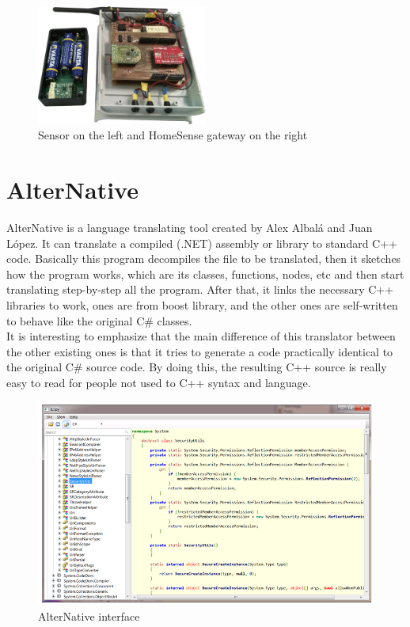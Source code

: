 \begin{figure}[H]\begin{center}
 \centering
  \captionsetup{justification=centering}
  \includegraphics[width=0.5\textwidth]{pictures/proposal/homesense}
  \caption{Sensor on the left and HomeSense gateway on the right \label{fig:Proposal-HomeSense}}
\end{center}\end{figure}

\section{AlterNative}\label{S:Proposal-AlterNative}
AlterNative is a language translating tool created by Alex Albal\'{a} and Juan L\'{o}pez. It can translate a compiled (.NET) assembly or library to standard C++ code. Basically this program decompiles the file to be translated, then it sketches how the program works, which are its classes, functions, nodes, etc and then start translating step-by-step all the program. After that, it links the necessary C++ libraries to work, ones are from boost library, and the other ones are self-written to behave like the original C\# classes.
\\
It is interesting to emphasize that the main difference of this translator between the other existing ones is that it tries to generate a code practically identical to the original C\# source code. By doing this, the resulting C++ source is really easy to read for people not used to C++ syntax and language.
\begin{figure}[H]\begin{center}
 \centering
  \captionsetup{justification=centering}
 \includegraphics[scale=0.65]{pictures/proposal/alternativeUI}
  \caption{AlterNative interface \label{fig:Proposal-AN}}
\end{center}\end{figure}

